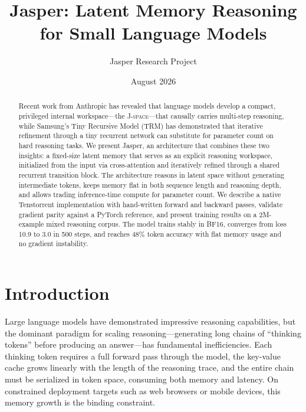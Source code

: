 \documentclass[11pt,a4paper]{article}
\title{\textbf{Jasper: Latent Memory Reasoning for Small Language Models}}
\author{Jasper Research Project}
\date{August 2026}
\newcommand{\jspace}{\textsc{J-space}}
\begin{document}
\maketitle

\begin{abstract}
\noindent
Recent work from Anthropic has revealed that language models develop a compact, privileged internal workspace---the \jspace{}---that causally carries multi-step reasoning, while Samsung's Tiny Recursive Model (TRM) has demonstrated that iterative refinement through a tiny recurrent network can substitute for parameter count on hard reasoning tasks. We present Jasper, an architecture that combines these two insights: a fixed-size latent memory that serves as an explicit reasoning workspace, initialized from the input via cross-attention and iteratively refined through a shared recurrent transition block. The architecture reasons in latent space without generating intermediate tokens, keeps memory flat in both sequence length and reasoning depth, and allows trading inference-time compute for parameter count. We describe a native Tenstorrent implementation with hand-written forward and backward passes, validate gradient parity against a PyTorch reference, and present training results on a 2M-example mixed reasoning corpus. The model trains stably in BF16, converges from loss 10.9 to 3.0 in 500 steps, and reaches 48\% token accuracy with flat memory usage and no gradient instability.
\end{abstract}

\tableofcontents
\newpage

\section{Introduction}

Large language models have demonstrated impressive reasoning capabilities, but the dominant paradigm for scaling reasoning---generating long chains of ``thinking tokens'' before producing an answer---has fundamental inefficiencies. Each thinking token requires a full forward pass through the model, the key-value cache grows linearly with the length of the reasoning trace, and the entire chain must be serialized in token space, consuming both memory and latency. On constrained deployment targets such as web browsers or mobile devices, this memory growth is the binding constraint.
\end{document}

